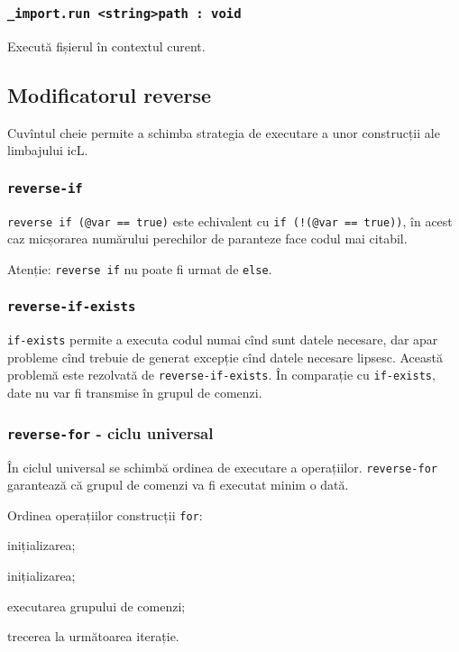 \subsubsection{\lstinline|_import.run <string>path : void|}

Execută fișierul în contextul curent.

\subsection{Modificatorul {\color{blue2} reverse}}

Cuvîntul cheie  permite a schimba strategia de executare a unor construcții ale limbajului icL.

\subsubsection{\lstinline|reverse-if|}

\lstinline|reverse if (@var == true)| este echivalent cu \lstinline|if (!(@var == true))|, în acest caz micșorarea numărului perechilor de paranteze face codul mai citabil.

Atenție: \lstinline|reverse if| nu poate fi urmat de \lstinline|else|.

\subsubsection{\lstinline|reverse-if-exists|}

\lstinline|if-exists| permite a executa codul numai cînd sunt datele necesare, dar apar probleme cînd trebuie de generat excepție cînd datele necesare lipsesc. Această problemă este rezolvată de \lstinline|reverse-if-exists|. În comparație cu \lstinline|if-exists|, date nu var fi transmise în grupul de comenzi.

\subsubsection{\lstinline|reverse-for| - ciclu universal}

În ciclul universal se schimbă ordinea de executare a operațiilor. \lstinline|reverse-for| garantează că grupul de comenzi va fi executat minim o dată.

Ordinea operațiilor construcții \lstinline|for|:
\begin{icEnum}
	\item inițializarea;
	\item inițializarea;
	\item executarea grupului de comenzi;
	\item trecerea la următoarea iterație.
\end{icEnum}

